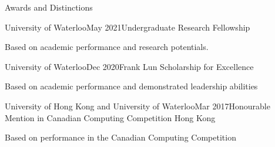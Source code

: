 \documentclass{cv}
\begin{document}
\begin{rSection}{Awards and Distinctions}
\begin{rSubsection}{University of Waterloo}{May 2021}{Undergraduate Research Fellowship}{}
	\item Based on academic performance and research potentials.
\end{rSubsection}

\begin{rSubsection}{University of Waterloo}{Dec 2020}{Frank Lun Scholarship for Excellence}{}
	\item Based on academic performance and demonstrated leadership abilities
\end{rSubsection}



\begin{rSubsection}{University of Hong Kong and University of Waterloo}{Mar 2017}{Honourable Mention in Canadian Computing Competition Hong Kong}{}
	\item Based on performance in the Canadian Computing Competition 
\end{rSubsection}
\end{rSection}
\end{document}
